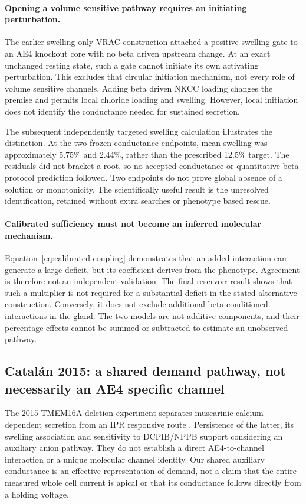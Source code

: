 \paragraph{Opening a volume sensitive pathway requires an initiating perturbation.}
The earlier swelling-only VRAC construction attached a positive swelling gate to an AE4 knockout core with no beta driven upstream change. At an exact unchanged resting state, such a gate cannot initiate its own activating perturbation. This excludes that circular initiation mechanism, not every role of volume sensitive channels. Adding beta driven NKCC loading changes the premise and permits local chloride loading and swelling. However, local initiation does not identify the conductance needed for sustained secretion.

The subsequent independently targeted swelling calculation illustrates the distinction. At the two frozen conductance endpoints, mean swelling was approximately 5.75\% and 2.44\%, rather than the prescribed 12.5\% target. The residuals did not bracket a root, so no accepted conductance or quantitative beta-protocol prediction followed. Two endpoints do not prove global absence of a solution or monotonicity. The scientifically useful result is the unresolved identification, retained without extra searches or phenotype based rescue.

\paragraph{Calibrated sufficiency must not become an inferred molecular mechanism.}
Equation~\eqref{eq:calibrated-coupling} demonstrates that an added interaction can generate a large deficit, but its coefficient derives from the phenotype. Agreement is therefore not an independent validation. The final reservoir result shows that such a multiplier is not required for a substantial deficit in the stated alternative construction. Conversely, it does not exclude additional beta conditioned interactions in the gland. The two models are not additive components, and their percentage effects cannot be summed or subtracted to estimate an unobserved pathway.

\subsection{Catalán 2015: a shared demand pathway, not necessarily an AE4 specific channel}

The 2015 TMEM16A deletion experiment separates muscarinic calcium dependent secretion from an IPR responsive route \citep{Catalan2015}. Persistence of the latter, its swelling association and sensitivity to DCPIB/NPPB support considering an auxiliary anion pathway. They do not establish a direct AE4-to-channel interaction or a unique molecular channel identity. Our shared auxiliary conductance is an effective representation of demand, not a claim that the entire measured whole cell current is apical or that its conductance follows directly from a holding voltage.

